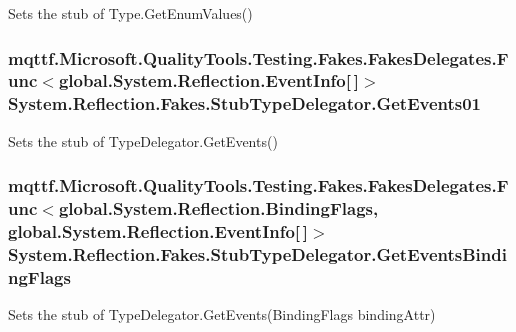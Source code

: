 Sets the stub of Type.\-Get\-Enum\-Values()

\hypertarget{class_system_1_1_reflection_1_1_fakes_1_1_stub_type_delegator_a35b4a66e45ff931f3730c3f238b6a6bd}{
\subsubsection[{Get\-Events01}]{\setlength{\rightskip}{0pt plus 5cm}mqttf.\-Microsoft.\-Quality\-Tools.\-Testing.\-Fakes.\-Fakes\-Delegates.\-Func$<$global.\-System.\-Reflection.\-Event\-Info\mbox{[}$\,$\mbox{]}$>$ System.\-Reflection.\-Fakes.\-Stub\-Type\-Delegator.\-Get\-Events01}}\label{class_system_1_1_reflection_1_1_fakes_1_1_stub_type_delegator_a35b4a66e45ff931f3730c3f238b6a6bd}


Sets the stub of Type\-Delegator.\-Get\-Events()

\hypertarget{class_system_1_1_reflection_1_1_fakes_1_1_stub_type_delegator_ab20f38607fdd618705331055d0cac157}{
\subsubsection[{Get\-Events\-Binding\-Flags}]{\setlength{\rightskip}{0pt plus 5cm}mqttf.\-Microsoft.\-Quality\-Tools.\-Testing.\-Fakes.\-Fakes\-Delegates.\-Func$<$global.\-System.\-Reflection.\-Binding\-Flags, global.\-System.\-Reflection.\-Event\-Info\mbox{[}$\,$\mbox{]}$>$ System.\-Reflection.\-Fakes.\-Stub\-Type\-Delegator.\-Get\-Events\-Binding\-Flags}}\label{class_system_1_1_reflection_1_1_fakes_1_1_stub_type_delegator_ab20f38607fdd618705331055d0cac157}


Sets the stub of Type\-Delegator.\-Get\-Events(\-Binding\-Flags binding\-Attr)

